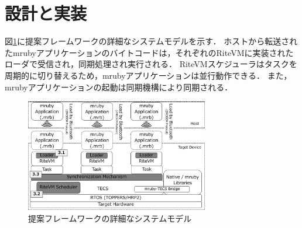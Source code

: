 \documentclass[submit,techrep]{ipsj}
\begin{document}
%
%
%
\section{設計と実装}
\vspace{-2mm}
\label{sec:Design and Implementation}
図\ref{fig:system_model}に提案フレームワークの詳細なシステムモデルを示す．
ホストから転送されたmrubyアプリケーションのバイトコードは，それぞれのRiteVMに実装されたローダで受信され，同期処理され実行される．
RiteVMスケジューラはタスクを周期的に切り替えるため，mrubyアプリケーションは並行動作できる．
また，mrubyアプリケーションの起動は同期機構により同期される．　
\begin{figure}[t]
    \centering
    \includegraphics[width=8cm,clip]{../EMSOFT2016/figure/system_model.pdf}
    \caption{提案フレームワークの詳細なシステムモデル}
\vspace{-2mm}
    \label{fig:system_model}
\end{figure}
\end{document}
